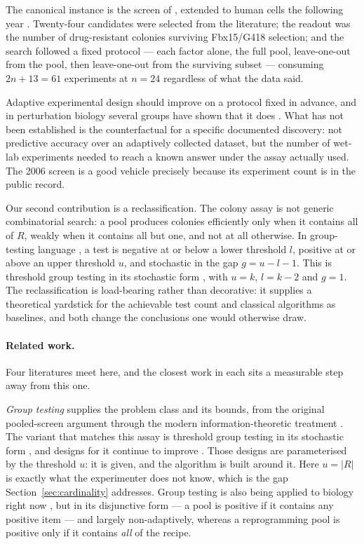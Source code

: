 \documentclass[11pt]{article}
\begin{document}
The canonical instance is the screen of \citet{takahashi2006}, extended to human
cells the following year \citep{takahashi2007}. Twenty-four candidates were
selected from the literature; the readout was the number of
drug-resistant colonies surviving Fbx15/G418 selection; and the search followed
a fixed protocol --- each factor alone, the full pool, leave-one-out from the
pool, then leave-one-out from the surviving subset --- consuming $2n + 13 = 61$
experiments at $n = 24$ regardless of what the data said.

Adaptive experimental design \citep{lindley1956, chaloner1995, rainforth2024}
should improve on a protocol fixed in advance, and in perturbation biology
several groups have shown that it does \citep{zhang2023, tosh2025}. What has not been established is
the counterfactual for a specific documented discovery: not predictive accuracy
over an adaptively collected dataset, but the number of wet-lab experiments
needed to reach a known answer under the assay actually used. The 2006 screen
is a good vehicle precisely because its experiment count is in the public
record.

Our second contribution is a reclassification. The colony assay is not generic
combinatorial search: a pool produces colonies efficiently only when it contains
all of $R$, weakly when it contains all but one, and not at all otherwise. In
group-testing language \citep{dorfman1943, aldridge2019}, a test is negative at or below a
lower threshold $l$, positive at or above an upper threshold $u$, and stochastic
in the gap $g = u - l - 1$. This is threshold group testing
\citep{damaschke2006} in its stochastic form \citep{chan2013}, with $u = k$,
$l = k - 2$ and $g = 1$. The reclassification is load-bearing rather than
decorative: it supplies a theoretical yardstick for the achievable test count
and classical algorithms as baselines, and both change the conclusions one would
otherwise draw.

\paragraph{Related work.} Four literatures meet here, and the closest work in
each sits a measurable step away from this one.

\emph{Group testing} supplies the problem class and its bounds, from the
original pooled-screen argument \citep{dorfman1943} through the modern
information-theoretic treatment \citep{aldridge2019}. The variant that matches
this assay is threshold group testing \citep{damaschke2006} in its stochastic
form \citep{chan2013}, and designs for it continue to improve
\citep{bui2024}. Those designs are parameterised by the threshold $u$: it is
given, and the algorithm is built around it. Here $u = |R|$ is exactly what the
experimenter does not know, which is the gap Section~\ref{sec:cardinality}
addresses. Group testing is also being applied to biology right now
\citep{talamanca2026}, but in its disjunctive form --- a pool is positive if it
contains any positive item --- and largely non-adaptively, whereas a
reprogramming pool is positive only if it contains \emph{all} of the recipe.
\end{document}
